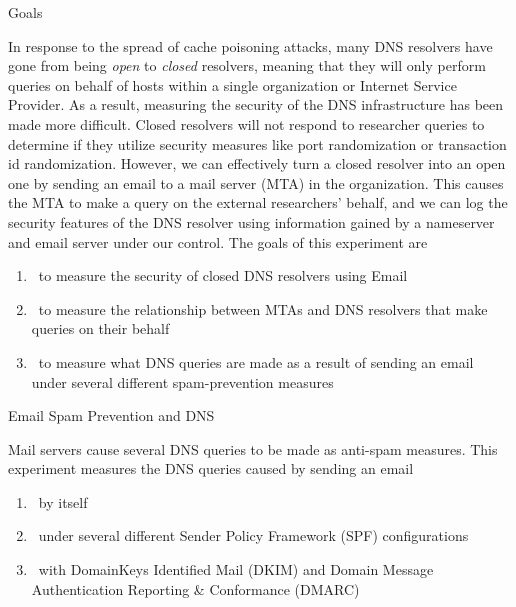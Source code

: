 \documentclass[final]{beamer}
\newlength{\onecolwid}
\begin{document}
\begin{frame}[t]
\begin{columns}[t]
\begin{column}{\onecolwid}


\begin{block}{Goals}

In response to the spread of cache poisoning attacks, many DNS resolvers have gone from being \emph{open} to \emph{closed} resolvers, meaning that they will only perform queries on behalf of hosts within a single organization or Internet Service Provider. As a result, measuring the security of the DNS infrastructure has been made more difficult. Closed resolvers will not respond to researcher queries to determine if they utilize security measures like port randomization or transaction id randomization. However, we can effectively turn a closed resolver into an open one by sending an email to a mail server (MTA) in the organization.  This causes the MTA to make a query on the external researchers' behalf, and we can log the security features of the DNS resolver using information gained by a nameserver and email server under our control. The goals of this experiment are
\vspace{-10px}
\begin{enumerate}
\item ~to measure the security of closed DNS resolvers using Email
\item ~to measure the relationship between MTAs and DNS resolvers that make queries on their behalf
\item ~to measure what DNS queries are made as a result of sending an email under several different spam-prevention measures
\end{enumerate}

\end{block}


\begin{block}{Email Spam Prevention and DNS}

Mail servers cause several DNS queries to be made as anti-spam measures. This experiment measures the DNS queries caused by sending an email
\begin{enumerate}
\item ~by itself
\item ~under several different Sender Policy Framework (SPF) configurations
\item ~with DomainKeys Identified Mail (DKIM) and Domain Message Authentication Reporting \& Conformance (DMARC)
\end{enumerate}


\end{block}
\end{column}
\end{columns}
\end{frame}
\end{document}
